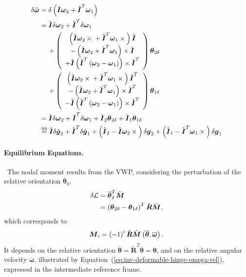 \documentclass[10pt,dvips,fleqn,subeqn]{report}
\newcommand{\T}[1]{\boldsymbol{#1}}
\newcommand{\equu}{\overset{\text{uu}}{=}}
\begin{document}
\begin{align}
	\delta\hat{\T{\omega}} &= 
	\delta\plbr{
		\hat{\T{I}} \T{\omega}_2
		+ \hat{\T{I}}^T \T{\omega}_1
	} \\
	&= \hat{\T{I}} \delta\T{\omega}_2
		+ \hat{\T{I}}^T \delta\T{\omega}_1
	\nonumber \\
	&\mbox{\hspace{12pt}}
	+ \plbr{\cvvect{
		\plbr{
			\hat{\T{I}} \T{\omega}_2 \times{}
			+ \hat{\T{I}}^T \T{\omega}_1 \times{}
		} \hat{\T{I}} \\
		- \plbr{
			\hat{\T{I}} \T{\omega}_2 + \hat{\T{I}}^T \T{\omega}_1
		} \times \hat{\T{I}} \\
		+ \hat{\T{I}} \plbr{
			\hat{\T{I}}^T \plbr{
				\T{\omega}_2 - \T{\omega}_1
			}
		}\times \hat{\T{I}}^T
	}} \T{\theta}_{2\delta} \nonumber \\
	&\mbox{\hspace{12pt}}
	+ \plbr{\cvvect{
		\plbr{
			\hat{\T{I}} \T{\omega}_2 \times{}
			+ \hat{\T{I}}^T \T{\omega}_1 \times{}
		} \hat{\T{I}}^T \\
		- \plbr{
			\hat{\T{I}} \T{\omega}_2 + \hat{\T{I}}^T \T{\omega}_1
		} \times \hat{\T{I}}^T \\
		- \hat{\T{I}} \plbr{
			\hat{\T{I}}^T \plbr{
				\T{\omega}_2 - \T{\omega}_1
			}
		}\times \hat{\T{I}}^T
	}} \T{\theta}_{1\delta} \\
	&= \hat{\T{I}} \delta\T{\omega}_2
		+ \hat{\T{I}}^T \delta\T{\omega}_1
	+ \hat{\T{I}}_2 \T{\theta}_{2\delta}
	+ \hat{\T{I}}_1 \T{\theta}_{1\delta} \\
	&\equu
	\hat{\T{I}} \delta\dot{\T{g}}_2
		+ \hat{\T{I}}^T \delta\dot{\T{g}}_1
	+ \plbr{\hat{\T{I}}_2 - \hat{\T{I}} \T{\omega}_2\times{}}
		\delta\T{g}_2
	+ \plbr{\hat{\T{I}}_1 - \hat{\T{I}}^T \T{\omega}_1\times{}}
		\delta\T{g}_1
\end{align}




\paragraph{Equilibrium Equations.} \
The nodal moment results from the VWP, considering the perturbation 
of the relative orientation $\overline{\T{\theta}}_{\delta}$,
\begin{align}
	\delta\mathcal{L}
	& = \overline{\T{\theta}}_{\delta}^T \tilde{\T{M}} \\
	&= \plbr{
		\T{\theta}_{2\delta} - \T{\theta}_{1\delta}
	}^T \hat{\T{R}} \tilde{\T{M}} ,
\end{align}
which corresponds to
\begin{equation}
	\T{M}_i = \plbr{-1}^i \hat{\T{R}}
		\tilde{\T{M}}\plbr{\overline{\T{\theta}}, \overline{\T{\omega}}} .
\end{equation}
It depends on the relative orientation 
$\overline{\T{\theta}}=\tilde{\T{R}}^T\T{\theta}=\T{\theta}$,
and on the relative angular velocity $\overline{\T{\omega}}$,
illustrated by Equation~(\ref{eq:inv-deformable-hinge-omega-rel}),
expressed in the intermediate reference frame.
\end{document}
